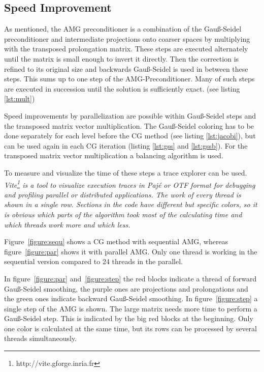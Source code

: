 \documentclass[a4paper,11pt]{scrartcl}
\begin{document}
\subsection{Speed Improvement}
As mentioned, the AMG preconditioner is a combination of the Gauß-Seidel
preconditioner and intermediate projections onto coarser spaces
by multiplying with the transposed prolongation matrix. These steps are
executed alternately until the matrix is small enough to invert it directly.
Then the correction is refined to its original size and backwards Gauß-Seidel is
used in between these steps.
This sums up to one step of the AMG-Preconditioner. Many of such steps are
executed in succession until the solution is sufficiently exact. (see listing \ref{lst:mult})

Speed improvements by parallelization are possible within Gauß-Seidel steps
and the transposed matrix vector multiplication. The Gauß-Seidel coloring has to
be done separately for each level before the CG method (see listing \ref{lst:jacobi}),
 but can be used again
in each CG iteration (listing \ref{lst:gss} and \ref{lst:gssb}). For the transposed matrix vector multiplication a balancing algorithm is used.

To measure and visualize the time of these steps a trace explorer can be used. \em Vite\em\footnote{http://vite.gforge.inria.fr} is a tool to visualize execution traces in Pajé
 or OTF format for debugging and profiling parallel or distributed applications.
The work of every thread is shown in a single row. Sections in the code have different but specific
colors, so it is obvious which parts of the algorithm took most of the calculating time and
which threads work more and which less.


Figure~\ref{figure:sequ} shows a CG method with sequential AMG, whereas
figure~\ref{figure:par} shows it with parallel AMG\@.
Only one thread is working in the sequential version compared to 24 threads in
the parallel.

In figure~\ref{figure:par} and~\ref{figure:step} the red blocks indicate a
thread of forward Gauß-Seidel smoothing, the purple ones are projections and
prolongations and the green ones indicate backward Gauß-Seidel smoothing.
In figure~\ref{figure:step} a single step of the AMG is shown. The large matrix
needs more time to perform a Gauß-Seidel step.
This is indicated by the big red blocks at the beginning. Only one color is
calculated at the same time, but its rows can be processed by several threads
simultaneously.
\end{document}
